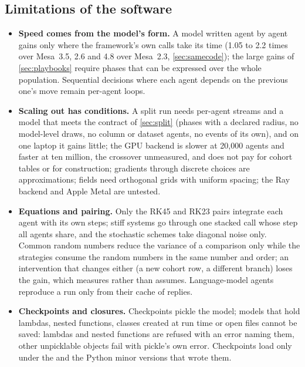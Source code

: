 \subsection{Limitations of the software}
\label{sec:limitations}

\begin{itemize}[leftmargin=*,itemsep=2pt]
  \item \textbf{Speed comes from the model's form.} A model written agent by agent gains only
  where the framework's own calls take its time (1.05 to 2.2 times over Mesa~3.5, 2.6 and 4.8 over Mesa~2.3, \cref{sec:samecode}); the
  large gains of \cref{sec:playbooks} require phases that can be
  expressed over the whole population. Sequential decisions where each agent depends on the
  previous one's move remain per-agent loops.
  \item \textbf{Scaling out has conditions.} A split run needs per-agent streams and a model
  that meets the contract of \cref{sec:split} (phases with a declared radius, no model-level
  draws, no column or dataset agents, no events of its own), and on one laptop it gains
  little; the GPU backend is slower at 20,000 agents and faster at ten million, the
  crossover unmeasured, and does not pay for cohort tables or for construction; gradients through discrete choices are approximations; fields
  need orthogonal grids with uniform spacing; the Ray backend and Apple Metal are untested.
  \item \textbf{Equations and pairing.} Only the RK45 and RK23 pairs integrate each agent with
  its own steps; stiff systems go through one stacked call whose step all agents share, and the
  stochastic schemes take diagonal noise only. Common random numbers reduce the variance of a
  comparison only while the strategies consume the random numbers in the same number and
  order; an intervention that changes either (a new cohort row, a different branch) loses the
  gain, which  measures rather than assumes. Language-model agents
  reproduce a run only from their cache of replies.
  \item \textbf{Checkpoints and closures.} Checkpoints pickle the model; models that hold
  lambdas, nested functions, classes created at run time or open files cannot be saved: lambdas
  and nested functions are refused with an error naming them, other unpicklable objects fail
  with pickle's own error. Checkpoints load only under the \modelly{} and the
  Python minor versions that wrote them.
\end{itemize}
